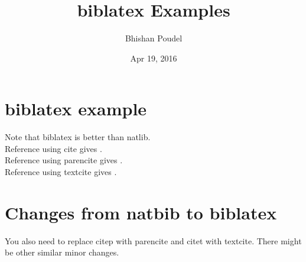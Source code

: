 \documentclass{article}
\title{biblatex Examples}
\author{Bhishan Poudel}
\date{Apr 19, 2016}
\begin{document}
\maketitle
\tableofcontents



\section{biblatex example}
Note that biblatex is better than natlib.\\
Reference using cite gives \cite{key}.\\
Reference using parencite gives \parencite{key}.\\
Reference using textcite gives \textcite{key}.\\

\section{Changes from natbib to biblatex}
You also need to replace citep with parencite and citet with textcite. There might be other similar minor changes.

\newpage
\nocite{*}
\printbibliography
\end{document}
